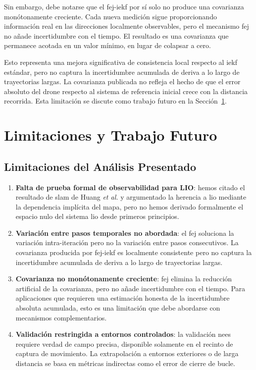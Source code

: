 Sin embargo, debe notarse que el \gls{fej}-\gls{iekf} por sí solo no produce
una covarianza monótonamente creciente. Cada nueva medición sigue
proporcionando información real en las direcciones localmente observables,
pero el mecanismo \gls{fej} no añade incertidumbre con el tiempo. El resultado
es una covarianza que permanece acotada en un valor mínimo, en lugar de
colapsar a cero.

Esto representa una mejora significativa de consistencia local respecto al
\gls{iekf} estándar, pero no captura la incertidumbre acumulada de deriva a
lo largo de trayectorias largas. La covarianza publicada no refleja el hecho
de que el error absoluto del drone respecto al sistema de referencia inicial
crece con la distancia recorrida. Esta limitación se discute como trabajo
futuro en la Sección~\ref{sec:fej-trabajo-futuro}.

\section{Limitaciones y Trabajo Futuro}
\label{sec:fej-trabajo-futuro}

\subsection{Limitaciones del Análisis Presentado}

\begin{enumerate}
    \item \textbf{Falta de prueba formal de observabilidad para LIO}: hemos
    citado el resultado de \gls{slam} de Huang \emph{et al.} y argumentado la
    herencia a \gls{lio} mediante la dependencia implícita del mapa, pero no
    hemos derivado formalmente el espacio nulo del sistema \gls{lio} desde
    primeros principios.
    \item \textbf{Variación entre pasos temporales no abordada}: el \gls{fej}
    soluciona la variación intra-iteración pero no la variación entre pasos
    consecutivos. La covarianza producida por \gls{fej}-\gls{iekf} es
    localmente consistente pero no captura la incertidumbre acumulada de
    deriva a lo largo de trayectorias largas.
    \item \textbf{Covarianza no monótonamente creciente}: \gls{fej} elimina
    la reducción artificial de la covarianza, pero no añade incertidumbre con
    el tiempo. Para aplicaciones que requieren una estimación honesta de la
    incertidumbre absoluta acumulada, esto es una limitación que debe
    abordarse con mecanismos complementarios.
    \item \textbf{Validación restringida a entornos controlados}: la validación
    \gls{nees} requiere verdad de campo precisa, disponible solamente en el
    recinto de captura de movimiento. La extrapolación a entornos exteriores
    o de larga distancia se basa en métricas indirectas como el error de cierre
    de bucle.
\end{enumerate}

